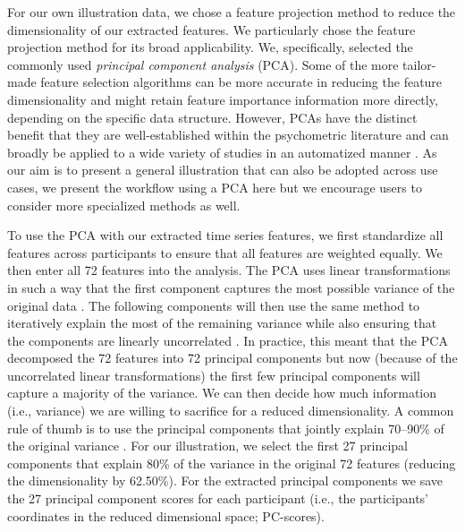 For our own illustration data, we chose a feature projection method to
reduce the dimensionality of our extracted features. We particularly
chose the feature projection method for its broad applicability. We,
specifically, selected the commonly used
\textit{principal component analysis} (PCA). Some of the more
tailor-made feature selection algorithms can be more accurate in
reducing the feature dimensionality and might retain feature importance
information more directly, depending on the specific data structure.
However, PCAs have the distinct benefit that they are well-established
within the psychometric literature \citep{jolliffe2011} and can broadly
be applied to a wide variety of studies in an automatized manner
\citep{abdi2010}. As our aim is to present a general illustration that
can also be adopted across use cases, we present the workflow using a
PCA here but we encourage users to consider more specialized methods as
well.

To use the PCA with our extracted time series features, we first
standardize all features across participants to ensure that all features
are weighted equally. We then enter all 72 features into the analysis.
The PCA uses linear transformations in such a way that the first
component captures the most possible variance of the original data
\citep[e.g., by finding a vector that maximizes the sum of squared distances][]{jolliffe2002, abdi2010}.
The following components will then use the same method to iteratively
explain the most of the remaining variance while also ensuring that the
components are linearly uncorrelated \citep{shlens2014}. In practice,
this meant that the PCA decomposed the 72 features into 72 principal
components but now (because of the uncorrelated linear transformations)
the first few principal components will capture a majority of the
variance. We can then decide how much information (i.e., variance) we
are willing to sacrifice for a reduced dimensionality. A common rule of
thumb is to use the principal components that jointly explain 70--90\%
of the original variance
\citep[i.e., cumulative percentage explained variance; e.g.,][]{jackson2003}.
For our illustration, we select the first 27 principal components that
explain 80\% of the variance in the original 72 features (reducing the
dimensionality by 62.50\%). For the extracted principal components we
save the 27 principal component scores for each participant (i.e., the
participants' coordinates in the reduced dimensional space; PC-scores).

